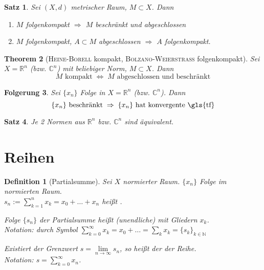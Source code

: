 \documentclass[ngerman,a4paper]{report}
\theoremstyle{break}
\newtheorem{theorem}{Theorem}[section]
\newtheorem{satz}[theorem]{Satz}
\newtheorem*{definition}{Definition}
\newtheorem{conclusion}[theorem]{Folgerung}
\newcommand{\person}[1]{\textsc{#1}}
\newcommand{\highlight}[1]{\emph{#1}}
\begin{document}
\begin{satz}
	Sei $(X,d)$ metrischer Raum, $M\subset X$. Dann
	\begin{enumerate}[label={\arabic*)}]
		\item $M$ folgenkompakt $\Rightarrow$ $M$ beschränkt und abgeschlossen
		\item $M$ folgenkompakt, $A\subset M$ abgeschlossen $\Rightarrow$ $A$ folgenkompakt.
	\end{enumerate}
\end{satz}
\begin{theorem}[\person{Heine}-\person{Borell} kompakt, \person{Bolzano}-\person{Weierstraß} folgenkompakt]
	Sei $X=\mathbb{R}^n$ (bzw. $\mathbb{C}^n$) mit beliebiger Norm, $M\subset X$. Dann \[ M \text{ kompakt} \;\Leftrightarrow\; M \text{ abgeschlossen und beschränkt} \]
\end{theorem}
\begin{conclusion}
	Sei $\{x_n\}$ Folge in $X=\mathbb{R}^n$ (bzw. $\mathbb{C}^n$). Dann \[ \{x_n\}\text{ beschränkt} \;\Rightarrow \; \{x_n\} \text{ hat konvergente \gls{tf}}\]
\end{conclusion}
\begin{satz}
	Je 2 Normen aus $\mathbb{R}^n$ bzw. $\mathbb{C}^n$ sind äquivalent.
\end{satz}

\section{Reihen}
\begin{definition}[Partialsumme]
	Sei $X$ normierter Raum. $\{x_n\}$ Folge im normierten Raum.\\
	$s_n :=\sum_{k=1}^n x_k = x_0 + \dotsc + x_n$ heißt .
	
	Folge $\{s_n\}$ der Partialsumme heißt \highlight{(unendliche)} mit Gliedern $x_k$.\\
	Notation: durch Symbol $\sum_{k=0}^\infty x_k = x_0 + \dotsc = \sum_k x_k = \{s_k\}_{k\in\mathbb{N}}$
	
	Existiert der Grenzwert $s = \lim\limits_{n\rightarrow\infty} s_n$, so heißt der  der Reihe.\\
	Notation: $s = \sum_{k=0}^\infty x_n$.
\end{definition}
\end{document}
